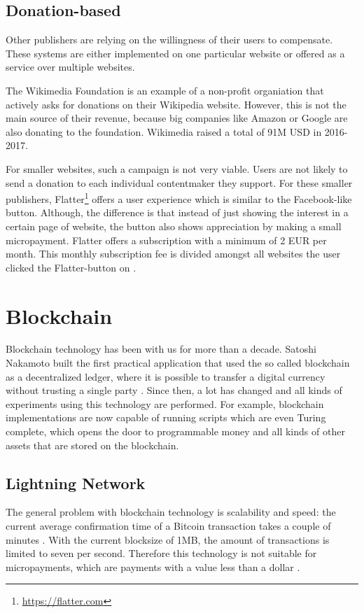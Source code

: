 \subsection{Donation-based}

Other publishers are relying on the willingness of their users to compensate. These systems are either implemented on one particular website or offered as a service over multiple websites. 

The Wikimedia Foundation is an example of a non-profit organiation that actively asks for donations on their Wikipedia website. However, this is not the main source of their revenue, because big companies like Amazon or Google are also donating to the foundation. Wikimedia raised a total of 91M USD in 2016-2017. \cite{wikimediadonation}

For smaller websites, such a campaign is not very viable. Users are not likely to send a donation to each individual contentmaker they support. For these smaller publishers, Flatter\footnote{\url{https://flatter.com}} offers a user experience which is similar to the Facebook-like button. Although, the difference is that instead of just showing the interest in a certain page of website, the button also shows appreciation by making a small micropayment. Flatter offers a subscription with a minimum of 2 EUR per month. This monthly subscription fee is divided amongst all websites the user clicked the Flatter-button on \cite{loll2010flattr}.







\section{Blockchain}

Blockchain technology has been with us for more than a decade. Satoshi Nakamoto built the first practical application that used the so called blockchain as a decentralized ledger, where it is possible to transfer a digital currency without trusting a single party \cite{nakamoto2019bitcoin}. Since then, a lot has changed and all kinds of experiments using this technology are performed. For example, blockchain implementations are now capable of running scripts which are even Turing complete, which opens the door to programmable money \cite{wood2014ethereum} and all kinds of other assets that are stored on the blockchain. 


\subsection{Lightning Network}
The general problem with blockchain technology is scalability and speed: the current average confirmation time of a Bitcoin transaction takes a couple of minutes \cite{bamert2013have}. With the current blocksize of 1MB, the amount of transactions is limited to seven per second. Therefore this technology is not suitable for micropayments, which are payments with a value less than a dollar \cite{definitionmicropayment}.

